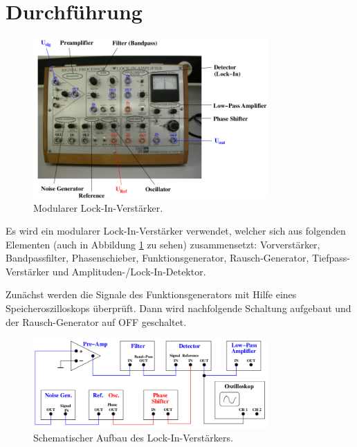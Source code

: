 \newpage
\section{Durchführung}
\label{sec:Durchführung}
\begin{figure}
  \centering
  \includegraphics[width=0.8\textwidth]{verstaerker.png}
  \caption{Modularer Lock-In-Verstärker\cite{sample}.}
  \label{fig:verstaerker}
\end{figure}

{Es wird ein modularer Lock-In-Verstärker verwendet, welcher sich aus} folgenden
Elementen (auch in Abbildung \ref{fig:verstaerker} zu sehen) zusammensetzt:
Vorverstärker, Bandpassfilter, Phasenschieber, Funktionsgenerator, Rausch-Generator,
Tiefpass-Verstärker und Amplituden-/Lock-In-Detektor.

Zunächst werden die Signale des Funktionsgenerators mit Hilfe eines Speicheroszilloskops
überprüft. Dann wird nachfolgende Schaltung aufgebaut und der Rausch-Generator auf
OFF geschaltet.
\begin{figure}
  \centering
  \includegraphics[width=0.8\textwidth]{schaltung.png}
  \caption{Schematischer Aufbau des Lock-In-Verstärkers\cite{sample}.}
  \label{fig:schaltung}
\end{figure}

